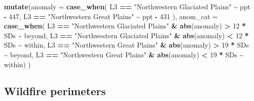 \documentclass[
]{article}
\newenvironment{Shaded}{\begin{snugshade}}{\end{snugshade}}
\newcommand{\AttributeTok}[1]{\textcolor[rgb]{0.13,0.29,0.53}{#1}}
\newcommand{\DecValTok}[1]{\textcolor[rgb]{0.00,0.00,0.81}{#1}}
\newcommand{\FunctionTok}[1]{\textcolor[rgb]{0.13,0.29,0.53}{\textbf{#1}}}
\newcommand{\NormalTok}[1]{#1}
\newcommand{\SpecialCharTok}[1]{\textcolor[rgb]{0.81,0.36,0.00}{\textbf{#1}}}
\newcommand{\StringTok}[1]{\textcolor[rgb]{0.31,0.60,0.02}{#1}}
\begin{document}
\begin{Shaded}
\begin{Highlighting}[]
      \FunctionTok{mutate}\NormalTok{(}\AttributeTok{anomaly =} \FunctionTok{case\_when}\NormalTok{(}
\NormalTok{        L3 }\SpecialCharTok{==} \StringTok{"Northwestern Glaciated Plains"} \SpecialCharTok{\textasciitilde{}}\NormalTok{ ppt }\SpecialCharTok{{-}} \DecValTok{447}\NormalTok{,  }
\NormalTok{        L3 }\SpecialCharTok{==} \StringTok{"Northwestern Great Plains"} \SpecialCharTok{\textasciitilde{}}\NormalTok{ ppt }\SpecialCharTok{{-}} \DecValTok{431}\NormalTok{ ), }
        \AttributeTok{anom\_cat =} \FunctionTok{case\_when}\NormalTok{(}
\NormalTok{          L3 }\SpecialCharTok{==} \StringTok{"Northwestern Glaciated Plains"} \SpecialCharTok{\&}
            \FunctionTok{abs}\NormalTok{(anomaly) }\SpecialCharTok{\textgreater{}} \DecValTok{12} \SpecialCharTok{*}\NormalTok{ SDs }\SpecialCharTok{\textasciitilde{}} \StringTok{\textquotesingle{}beyond\textquotesingle{}}\NormalTok{,}
\NormalTok{          L3 }\SpecialCharTok{==} \StringTok{"Northwestern Glaciated Plains"} \SpecialCharTok{\&} 
            \FunctionTok{abs}\NormalTok{(anomaly) }\SpecialCharTok{\textless{}} \DecValTok{12} \SpecialCharTok{*}\NormalTok{ SDs }\SpecialCharTok{\textasciitilde{}} \StringTok{\textquotesingle{}within\textquotesingle{}}\NormalTok{,}
\NormalTok{          L3 }\SpecialCharTok{==} \StringTok{"Northwestern Great Plains"} \SpecialCharTok{\&} 
            \FunctionTok{abs}\NormalTok{(anomaly) }\SpecialCharTok{\textgreater{}} \DecValTok{19} \SpecialCharTok{*}\NormalTok{ SDs }\SpecialCharTok{\textasciitilde{}} \StringTok{\textquotesingle{}beyond\textquotesingle{}}\NormalTok{,}
\NormalTok{          L3 }\SpecialCharTok{==} \StringTok{"Northwestern Great Plains"} \SpecialCharTok{\&} 
            \FunctionTok{abs}\NormalTok{(anomaly) }\SpecialCharTok{\textless{}} \DecValTok{19} \SpecialCharTok{*}\NormalTok{ SDs }\SpecialCharTok{\textasciitilde{}} \StringTok{\textquotesingle{}within\textquotesingle{}}\NormalTok{) ) }
\end{Highlighting}
\end{Shaded}

\subsection{Wildfire perimeters}\label{wildfire-perimeters}
\end{document}
